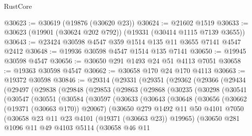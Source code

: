 \begin{lexlean}{RustCore}
\begin{coremodule}
@30623 := @30619 (@19876 (@30620 @23))
@30624 := @21602 @1519
@30633 := @30623 (@19901 (@30624 @202 @792)) (@19331 (@30414 @1115 @7139 @3655))
@30643 := @23424 @30598 @4547 @359 @1514 @135 @11 @3655 @7141 @4547 @2412
@30648 := @19936 @30598 @4547 @1514 @135 @7141
@30650 := @19945 @30598 @4547
@30656 := @30650 @291 @1493 @24 @51 @4113 @7051
@30658 := @19363 @30598 @4547
@30662 := @30658 @170 @24 @170 @4113
@30663 := @19372 @30598
@30846 := @29314
    (@29331
      (@29351
        (@29362
          (@29366
            (@29434
              (@29497
                (@29838
                  (@29848
                    (@29853
                      (@29863
                        (@29868
                          (@30235
                            (@30298
                              (@30541
                                (@30547
                                  (@30551
                                    (@30584
                                      (@30597
                                        (@30633
                                          (@30643
                                            (@30648
                                              (@30656
                                                (@30662 (@19371 (@30663 @170)) @20067)
                                                (@30650
                                                  @279
                                                  @1492
                                                  @11
                                                  @50
                                                  @4101
                                                  @7050
                                                  (@30658
                                                    @23
                                                    @11
                                                    @23
                                                    @4101
                                                    (@19371 (@30663 @23))
                                                    @19965)
                                                  (@30650
                                                    @281
                                                    @1096
                                                    @11
                                                    @49
                                                    @4103
                                                    @5114
                                                    (@30658
                                                      @46
                                                      @11

\end{coremodule}
\end{lexlean}
